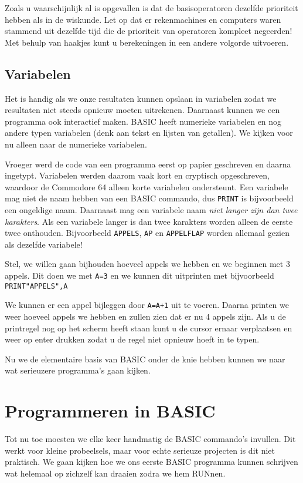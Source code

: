 \documentclass{article}
\begin{document}
Zoals u waarschijnlijk al is opgevallen is dat de basisoperatoren dezelfde prioriteit hebben als in de wiskunde.
Let op dat er rekenmachines en computers waren stammend uit dezelfde tijd die de prioriteit van operatoren kompleet negeerden!
Met behulp van haakjes kunt u berekeningen in een andere volgorde uitvoeren.

\subsection{Variabelen}

Het is handig als we onze resultaten kunnen opslaan in variabelen zodat we resultaten niet steeds opnieuw moeten uitrekenen.
Daarnaast kunnen we een programma ook interactief maken.
BASIC heeft numerieke variabelen en nog andere typen variabelen (denk aan tekst en lijsten van getallen).
We kijken voor nu alleen naar de numerieke variabelen.

Vroeger werd de code van een programma eerst op papier geschreven en daarna ingetypt.
Variabelen werden daarom vaak kort en cryptisch opgeschreven, waardoor de Commodore 64 alleen korte variabelen ondersteunt.
Een variabele mag niet de naam hebben van een BASIC commando, dus \verb:PRINT: is bijvoorbeeld een ongeldige naam.
Daarnaast mag een variabele naam \emph{niet langer zijn dan twee karakters}.
Als een variabele langer is dan twee karakters worden alleen de eerste twee onthouden.
Bijvoorbeeld \verb:APPELS:, \verb:AP: en \verb:APPELFLAP: worden allemaal gezien als dezelfde variabele!

Stel, we willen gaan bijhouden hoeveel appels we hebben en we beginnen met 3 appels.
Dit doen we met \verb:A=3: en we kunnen dit uitprinten met bijvoorbeeld \verb:PRINT"APPELS",A:

We kunnen er een appel bijleggen door \verb:A=A+1: uit te voeren.
Daarna printen we weer hoeveel appels we hebben en zullen zien dat er nu 4 appels zijn.
Als u de printregel nog op het scherm heeft staan kunt u de cursor ernaar verplaatsen en weer op enter drukken zodat u de regel niet opnieuw hoeft in te typen.

Nu we de elementaire basis van BASIC onder de knie hebben kunnen we naar wat serieuzere programma's gaan kijken.

\section{Programmeren in BASIC}

Tot nu toe moesten we elke keer handmatig de BASIC commando's invullen.
Dit werkt voor kleine probeelsels, maar voor echte serieuze projecten is dit niet praktisch.
We gaan kijken hoe we ons eerste BASIC programma kunnen schrijven wat helemaal op zichzelf kan draaien zodra we hem RUNnen.
\end{document}
